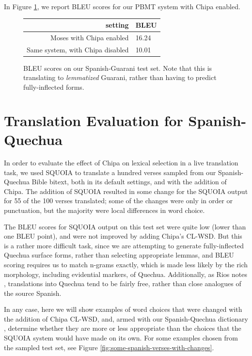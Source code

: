 In Figure \ref{fig:bleu-es-gn}, we report BLEU scores for our PBMT system with
Chipa enabled.

\begin{figure}
  \begin{centering}
  \begin{tabulary}{\textwidth}{|R|L|}
    \hline
    setting & BLEU \\
    \hline
    Moses with Chipa enabled &  16.24 \\
    \hline
    Same system, with Chipa disabled &  10.01 \\
    \hline
  \end{tabulary}
  \end{centering}
  \caption{BLEU scores on our Spanish-Guarani test set. Note that this is
  translating to \emph{lemmatized} Guarani, rather than having to predict
  fully-inflected forms.}
  \label{fig:bleu-es-gn}
\end{figure}


\section{Translation Evaluation for Spanish-Quechua}

In order to evaluate the effect of Chipa on lexical selection in a live
translation task, we used SQUOIA to translate a hundred verses sampled from our
Spanish-Quechua Bible bitext, both in its default settings, and with the
addition of Chipa. The addition of SQUOIA resulted in some change for the
SQUOIA output for 55 of the 100 verses translated; some of the changes were
only in order or punctuation, but the majority were local differences in word
choice.

The BLEU scores for SQUOIA output on this test set were quite low (lower than
one BLEU point), and were not improved by adding Chipa's CL-WSD. But this is a
rather more difficult task, since we are attempting to generate fully-inflected
Quechua surface forms, rather than selecting appropriate lemmas, and BLEU
scoring requires us to match n-grams exactly, which is made less likely by the
rich morphology, including evidential markers, of Quechua. Additionally, as
Rios notes \cite[\S 5.9]{rios2015basic}, translations into Quechua tend to be
fairly free, rather than close analogues of the source Spanish.

In any case, here we will show examples of word choices that were changed with
the addition of Chipa CL-WSD, and, armed with our Spanish-Quechua dictionary
\cite{academiamayor}, determine whether they are more or less appropriate than
the choices that the SQUOIA system would have made on its own. For some
examples chosen from the sampled test set, see Figure
\ref{fig:some-spanish-verses-with-changes}. 

